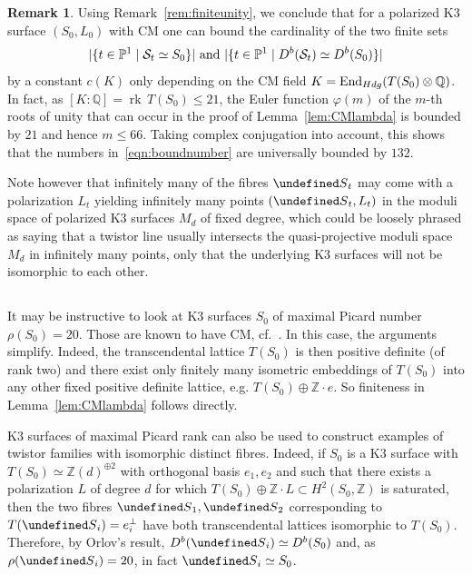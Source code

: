 \documentclass[11pt]{article}
\theoremstyle{definition}
\newtheorem{rema}[theo]{Remark}
\numberwithin{equation}{section}
\numberwithin{figure}{section}
\numberwithin{table}{section}
\let\cal\undefined
\DeclareMathOperator{\End}{End}
\DeclareMathOperator{\rk}{rk}
\newcommand{\Db}{{\rm D}^{\rm b}}
\newcommand{\cal}{\mathcal}
\newcommand{\ks}{{\cal S}}
\newcommand{\ZZ}{\mathbb{Z}}
\newcommand{\QQ}{\mathbb{Q}}
\newcommand{\PP}{\mathbb{P}}
\renewcommand{\cong}{\simeq}
\begin{document}
\begin{rema}\label{rem:132}
Using Remark~\ref{rem:finiteunity}, we conclude that for a polarized K3 surface $(S_0,L_0)$ with CM one can bound the cardinality of the two finite sets
\begin{equation}\label{eqn:boundnumber}
|\{t\in\PP^1\mid{\mathcal S}_t\cong S_0\}|\text{ and }|\{t\in\PP^1\mid\Db({\mathcal S}_t)\cong\Db(S_0)\}|
\end{equation}
by a constant $c(K)$ only depending on the CM field $K=\End_{\rm Hdg}(T(S_0)\otimes\QQ)$. In fact, as $[K:\QQ]=\rk\, T(S_0)\leq 21$, the Euler function $\varphi(m)$ of the $m$-th roots of unity that can occur in the proof of Lemma~\ref{lem:CMlambda} is bounded by $21$ and hence $m\leq 66$. Taking complex conjugation into account, this shows that the numbers in~\eqref{eqn:boundnumber} are universally bounded by $132$.
\end{rema}

Note however that infinitely many of the fibres $\ks_t$ may come with a polarization $L_t$ yielding infinitely many points $(\ks_t,L_t)$ in the moduli space of polarized K3 surfaces $M_d$ of fixed degree, which could be loosely phrased as saying that a twistor line usually intersects the quasi-projective moduli space $M_d$ in infinitely many points, only that the underlying K3 surfaces will not be isomorphic to each other.

\subsection{}
It may be instructive to look at K3 surfaces $S_0$ of maximal Picard number $\rho(S_0)=20$. Those are known to have CM, cf.~\cite[Remark~3.3.10]{HuyK3}. In this case, the arguments simplify. Indeed, the transcendental lattice $T(S_0)$ is then positive definite (of rank two) and there exist only finitely many isometric embeddings of $T(S_0)$ into any other fixed positive definite lattice, e.g. $T(S_0)\oplus\ZZ\cdot e$. So finiteness in Lemma~\ref{lem:CMlambda} follows directly.

K3 surfaces of maximal Picard rank can also be used to construct examples of twistor families with isomorphic distinct fibres. Indeed, if $S_0$ is a K3 surface with $T(S_0)\cong\ZZ(d)^{\oplus 2}$ with orthogonal basis $e_1,e_2$ and such that there exists a polarization $L$ of degree $d$ for which $T(S_0)\oplus\ZZ\cdot L\subset H^2(S_0,\ZZ)$ is saturated, then the two fibres $\ks_1,\ks_2$ corresponding to $T(\ks_i)=e_i^\perp$ have both transcendental lattices isomorphic to $T(S_0)$. Therefore, by Orlov's result, $\Db(\ks_i)\cong\Db(S_0)$ and, as $\rho(\ks_i)=20$, in fact $\ks_i\cong S_0$.
\end{document}
